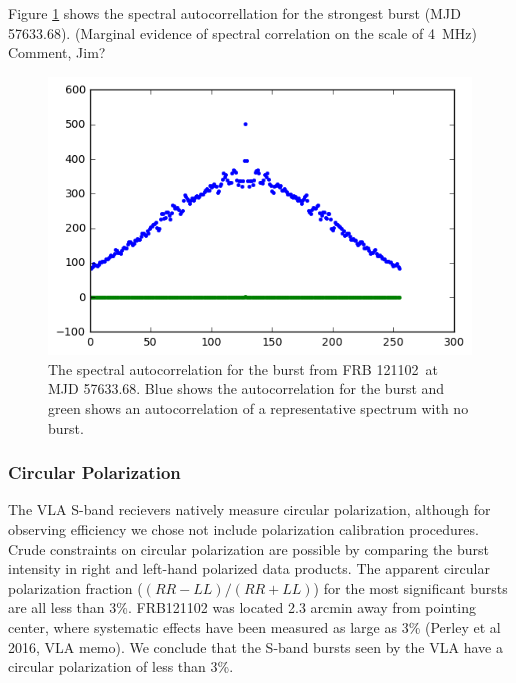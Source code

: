 \documentclass[twocolumn]{aastex61}
\newcommand{\frb}{FRB 121102}
\begin{document}
Figure \ref{fig:acf} shows the spectral autocorrellation for the strongest burst (MJD 57633.68). (Marginal evidence of spectral correlation on the scale of 4~MHz) {\color{red} Comment, Jim?}

\begin{figure}[htb]
\begin{center}
\includegraphics[width=0.9\columnwidth]{acf_57633_scan7}
\caption{The spectral autocorrelation for the burst from \frb\ at MJD 57633.68. Blue shows the autocorrelation for the burst and green shows an autocorrelation of a representative spectrum with no burst.
\label{fig:acf}}
\end{center}
\end{figure}

\subsubsection{Circular Polarization}
The VLA S-band recievers natively measure circular polarization, although for observing efficiency we chose not include polarization calibration procedures. Crude constraints on circular polarization are possible by comparing the burst intensity in right and left-hand polarized data products. The apparent circular polarization fraction ($(RR-LL)/(RR+LL)$) for the most significant bursts are all less than 3\%. FRB121102 was located 2.3 arcmin away from pointing center, where systematic effects have been measured as large as 3\% (Perley et al 2016, VLA memo). We conclude that the S-band bursts seen by the VLA have a circular polarization of less than 3\%.
\end{document}
